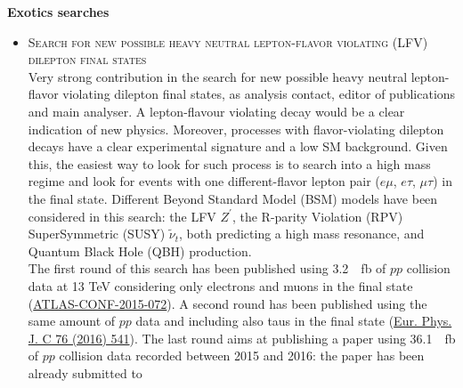 
\begin{cvinterests}


\cvinterest
{
\textbf{Exotics searches}\\
\vspace{-1.8em}
\begin{itemize}[labelwidth=0.05in,align=right,leftmargin=!,labelsep=0pt,
itemsep=0.0em]
\item[] \textsc{Search for new possible heavy neutral lepton-flavor violating
(LFV) dilepton final states}\\
Very strong contribution in the search for new possible heavy neutral
lepton-flavor violating dilepton final states, as analysis contact, editor
of publications and main analyser. A lepton-flavour violating decay would be a
clear indication of new physics. Moreover, processes with flavor-violating
dilepton decays have a clear experimental signature and a low SM background.
Given this, the easiest way to look for such process is to search into a high
mass regime and look for events with one different-flavor lepton pair
($e\mu$, $e\tau$, $\mu\tau$) in the final state. Different Beyond Standard
Model (BSM) models have been considered in this search: the LFV $Z^{\prime}$,
the R-parity Violation (RPV) SuperSymmetric (SUSY) $\tilde{\nu}_{t}$, both
predicting a high mass resonance, and Quantum Black Hole (QBH) production.\\
The first round of this search has been published using
\SI{3.2}{\per\femto\barn} of $pp$ collision data at 13 \si{\tera\electronvolt}
considering only electrons and muons in the final state
(\href{https://atlas.web.cern.ch/Atlas/GROUPS/PHYSICS/CONFNOTES/ATLAS-CONF-2015-072}{ATLAS-CONF-2015-072}).
A second round has been published using the same amount of $pp$ data and
including also taus in the final state (\href{https://link.springer.com/article/10.1140/epjc/s10052-016-4385-1}{Eur. Phys. J. C 76 (2016) 541}).
The last round aims at publishing a paper using \SI{36.1}{\per\femto\barn} of
$pp$ collision data recorded between 2015 and 2016: the paper has been already submitted to

\end{itemize}}
\end{cvinterests}
